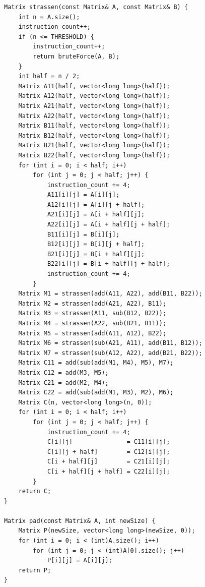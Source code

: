 \documentclass[12pt,a4paper]{article}
\begin{document}
\begin{lstlisting}[style=cppstyle,
    caption={C\'odigo completo de \texttt{strassen.cpp}},
    label={lst:strassen}]
Matrix strassen(const Matrix& A, const Matrix& B) {
    int n = A.size();
    instruction_count++;
    if (n <= THRESHOLD) {
        instruction_count++;
        return bruteForce(A, B);
    }
    int half = n / 2;
    Matrix A11(half, vector<long long>(half));
    Matrix A12(half, vector<long long>(half));
    Matrix A21(half, vector<long long>(half));
    Matrix A22(half, vector<long long>(half));
    Matrix B11(half, vector<long long>(half));
    Matrix B12(half, vector<long long>(half));
    Matrix B21(half, vector<long long>(half));
    Matrix B22(half, vector<long long>(half));
    for (int i = 0; i < half; i++)
        for (int j = 0; j < half; j++) {
            instruction_count += 4;
            A11[i][j] = A[i][j];
            A12[i][j] = A[i][j + half];
            A21[i][j] = A[i + half][j];
            A22[i][j] = A[i + half][j + half];
            B11[i][j] = B[i][j];
            B12[i][j] = B[i][j + half];
            B21[i][j] = B[i + half][j];
            B22[i][j] = B[i + half][j + half];
            instruction_count += 4;
        }
    Matrix M1 = strassen(add(A11, A22), add(B11, B22));
    Matrix M2 = strassen(add(A21, A22), B11);
    Matrix M3 = strassen(A11, sub(B12, B22));
    Matrix M4 = strassen(A22, sub(B21, B11));
    Matrix M5 = strassen(add(A11, A12), B22);
    Matrix M6 = strassen(sub(A21, A11), add(B11, B12));
    Matrix M7 = strassen(sub(A12, A22), add(B21, B22));
    Matrix C11 = add(sub(add(M1, M4), M5), M7);
    Matrix C12 = add(M3, M5);
    Matrix C21 = add(M2, M4);
    Matrix C22 = add(sub(add(M1, M3), M2), M6);
    Matrix C(n, vector<long long>(n, 0));
    for (int i = 0; i < half; i++)
        for (int j = 0; j < half; j++) {
            instruction_count += 4;
            C[i][j]               = C11[i][j];
            C[i][j + half]        = C12[i][j];
            C[i + half][j]        = C21[i][j];
            C[i + half][j + half] = C22[i][j];
        }
    return C;
}

Matrix pad(const Matrix& A, int newSize) {
    Matrix P(newSize, vector<long long>(newSize, 0));
    for (int i = 0; i < (int)A.size(); i++)
        for (int j = 0; j < (int)A[0].size(); j++)
            P[i][j] = A[i][j];
    return P;
}


\end{lstlisting}
\end{document}
